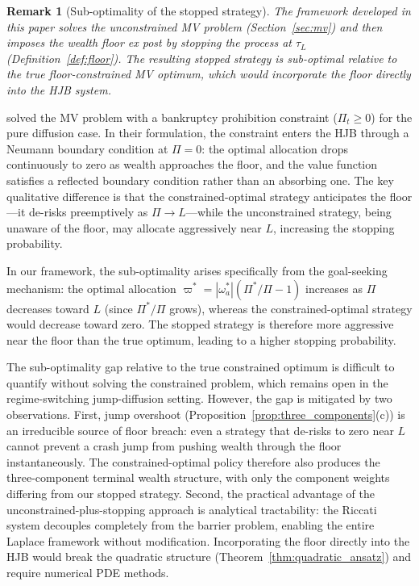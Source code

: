 \documentclass[11pt,a4paper]{article}
\numberwithin{equation}{section}
\newtheorem{remark}[theorem]{Remark}
\begin{document}
\begin{remark}[Sub-optimality of the stopped strategy]\label{rem:suboptimality}
The framework developed in this paper solves the unconstrained MV problem (Section~\ref{sec:mv}) and then imposes the wealth floor ex post by stopping the process at $\tau_L$ (Definition~\ref{def:floor}).  The resulting stopped strategy is sub-optimal relative to the true floor-constrained MV optimum, which would incorporate the floor directly into the HJB system.
\end{remark}


\citet{BieleckiJinPliskaZhou2005} solved the MV problem with a bankruptcy prohibition constraint ($\Pi_t \geq 0$) for the pure diffusion case.  In their formulation, the constraint enters the HJB through a Neumann boundary condition at $\Pi = 0$: the optimal allocation drops continuously to zero as wealth approaches the floor, and the value function satisfies a reflected boundary condition rather than an absorbing one.  The key qualitative difference is that the constrained-optimal strategy anticipates the floor---it de-risks preemptively as $\Pi \to L$---while the unconstrained strategy, being unaware of the floor, may allocate aggressively near $L$, increasing the stopping probability.

In our framework, the sub-optimality arises specifically from the goal-seeking mechanism: the optimal allocation $\varpi^* = |\omega^*_a|(\Pi^*/\Pi - 1)$ increases as $\Pi$ decreases toward $L$ (since $\Pi^*/\Pi$ grows), whereas the constrained-optimal strategy would decrease toward zero.  The stopped strategy is therefore more aggressive near the floor than the true optimum, leading to a higher stopping probability.

The sub-optimality gap relative to the true constrained optimum is 
difficult to quantify without solving the constrained problem, which 
remains open in the regime-switching jump-diffusion setting. However, 
the gap is mitigated by two observations. First, jump overshoot 
(Proposition~\ref{prop:three_components}(c)) is an irreducible source 
of floor breach: even a strategy that de-risks to zero near $L$ cannot 
prevent a crash jump from pushing wealth through the floor 
instantaneously. The constrained-optimal policy therefore also produces 
the three-component terminal wealth structure, with only the component 
weights differing from our stopped strategy. Second, the practical 
advantage of the unconstrained-plus-stopping approach is analytical 
tractability: the Riccati system decouples completely from the barrier 
problem, enabling the entire Laplace framework without modification. 
Incorporating the floor directly into the HJB would break the quadratic 
structure (Theorem~\ref{thm:quadratic_ansatz}) and require numerical 
PDE methods.
\end{document}
